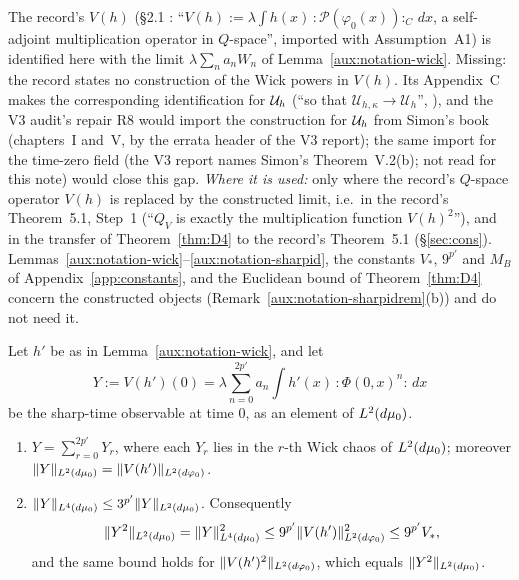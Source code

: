 \begin{gapnote}
The record's $V(h)$ (\S2.1 \cite[p.~6]{R}: ``$V(h):=\lambda\int
h(x)\,{:}\mathscr P(\varphi_0(x)){:}_C\,dx$, a self-adjoint multiplication operator in
$Q$-space'', imported with Assumption~A1) is identified here with the limit
$\lambda\sum_na_nW_n$ of Lemma~\ref{aux:notation-wick}.  Missing: the record states no
construction of the Wick powers in $V(h)$.  Its Appendix~C makes the corresponding
identification for $\mathcal U_h$ (``so that $\mathcal U_{h,\kappa}\to\mathcal U_h$'',
\cite[pp.~39--40]{R}), and the V3 audit's repair R8 would import the construction for $\mathcal U_h$
from Simon's book (chapters~I and~V, by the errata header of the V3 report); the same import for
the time-zero field (the V3 report names Simon's Theorem~V.2(b); not read for this note) would
close this gap.  \emph{Where it is used:} only where the record's $Q$-space operator $V(h)$ is
replaced by the constructed limit, i.e.\ in the record's Theorem~5.1, Step~1 (``$Q_V$ is exactly
the multiplication function $V(h)^2$''), and in the transfer of Theorem~\ref{thm:D4} to the
record's Theorem~5.1 (\S\ref{sec:cons}).  Lemmas~\ref{aux:notation-wick}--\ref{aux:notation-sharpid},
the constants $V_*$, $9^{p'}$ and $M_B$ of Appendix~\ref{app:constants}, and the Euclidean bound
of Theorem~\ref{thm:D4} concern the constructed objects (Remark~\ref{aux:notation-sharpidrem}(b))
and do not need it.
\end{gapnote}

\begin{auxlemma}\label{aux:notation-hyper}
Let $h'$ be as in Lemma~\ref{aux:notation-wick}, and let
\[
 Y:=V(h')(0)=\lambda\sum_{n=0}^{2p'}a_n\int h'(x)\,{:}\Phi(0,x)^n{:}\,dx
\]
be the sharp-time observable at time $0$, as an element of $L^2(d\mu_0)$.
\begin{enumerate}
\item[\textup{(i)}] $Y=\sum_{r=0}^{2p'}Y_r$, where each $Y_r$ lies in the $r$-th Wick chaos
of $L^2(d\mu_0)$; moreover $\|Y\|_{L^2(d\mu_0)}=\|V(h')\|_{L^2(d\varphi_0)}$.
\item[\textup{(ii)}] $\|Y\|_{L^4(d\mu_0)}\le3^{p'}\|Y\|_{L^2(d\mu_0)}$.  Consequently
\[
 \|Y^2\|_{L^2(d\mu_0)}=\|Y\|_{L^4(d\mu_0)}^2\le9^{p'}\|V(h')\|_{L^2(d\varphi_0)}^2\le9^{p'}V_* ,
\]
and the same bound holds for $\|V(h')^2\|_{L^2(d\varphi_0)}$, which equals $\|Y^2\|_{L^2(d\mu_0)}$.
\end{enumerate}
\end{auxlemma}

